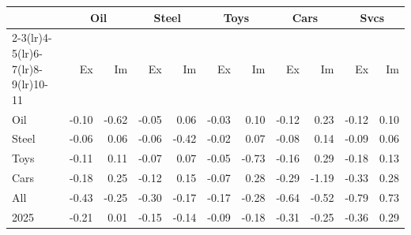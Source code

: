 \begin{tabular}{lrrrrrrrrrr}
\toprule
 & \multicolumn{2}{c}{Oil} & \multicolumn{2}{c}{Steel} & \multicolumn{2}{c}{Toys} & \multicolumn{2}{c}{Cars} & \multicolumn{2}{c}{Svcs} \\
\cmidrule(lr){2-3}\cmidrule(lr){4-5}\cmidrule(lr){6-7}\cmidrule(lr){8-9}\cmidrule(lr){10-11}
 & Ex & Im & Ex & Im & Ex & Im & Ex & Im & Ex & Im \\
\midrule
Oil & -0.10 & -0.62 & -0.05 & 0.06 & -0.03 & 0.10 & -0.12 & 0.23 & -0.12 & 0.10 \\
Steel & -0.06 & 0.06 & -0.06 & -0.42 & -0.02 & 0.07 & -0.08 & 0.14 & -0.09 & 0.06 \\
Toys & -0.11 & 0.11 & -0.07 & 0.07 & -0.05 & -0.73 & -0.16 & 0.29 & -0.18 & 0.13 \\
Cars & -0.18 & 0.25 & -0.12 & 0.15 & -0.07 & 0.28 & -0.29 & -1.19 & -0.33 & 0.28 \\
All & -0.43 & -0.25 & -0.30 & -0.17 & -0.17 & -0.28 & -0.64 & -0.52 & -0.79 & 0.73 \\
2025 & -0.21 & 0.01 & -0.15 & -0.14 & -0.09 & -0.18 & -0.31 & -0.25 & -0.36 & 0.29 \\
\bottomrule
\end{tabular}

